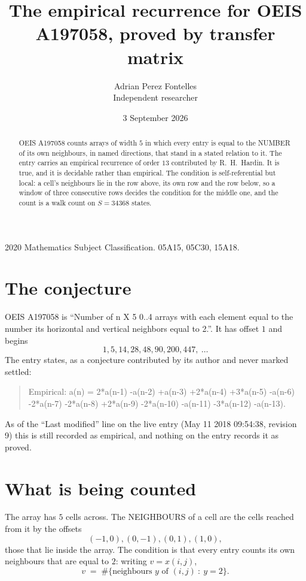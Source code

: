\documentclass[11pt,a4paper]{article}
\title{The empirical recurrence for OEIS A197058, proved by transfer matrix}
\author{Adrian Perez Fontelles\\ \small Independent researcher}
\date{3 September 2026}
\theoremstyle{plain}
\theoremstyle{definition}
\begin{document}
\maketitle

\begin{abstract}
OEIS A197058 counts arrays of width $5$ in which every entry is equal to the NUMBER of its own
neighbours, in named directions, that stand in a stated relation to it. The entry carries an
empirical recurrence of order $13$ contributed by R.~H.~Hardin. It is true, and it is
decidable rather than empirical. The condition is self-referential but local: a cell's
neighbours lie in the row above, its own row and the row below, so a window of three
consecutive rows decides the condition for the middle one, and the count is a walk count on
$S=34368$ states.
\end{abstract}

\noindent\small 2020 Mathematics Subject Classification. 05A15, 05C30, 15A18.\normalsize

\section{The conjecture}

OEIS A197058 is ``Number of n X 5 0..4 arrays with each element equal to the number its horizontal and vertical neighbors equal to 2.''. It has offset $1$ and begins
\[
1, 5, 14, 28, 48, 90, 200, 447,\ \dots
\]
The entry states, as a conjecture contributed by its author and never marked settled:
\begin{quote}
Empirical: a(n) = 2*a(n-1) -a(n-2) +a(n-3) +2*a(n-4) +3*a(n-5) -a(n-6) -2*a(n-7) -2*a(n-8) +2*a(n-9) -2*a(n-10) -a(n-11) -3*a(n-12) -a(n-13).
\end{quote}
As of the ``Last modified'' line on the live entry (May 11 2018 09:54:38, revision 9) this is still
recorded as empirical, and nothing on the entry records it as proved.

\section{What is being counted}

The array has $5$ cells across. The NEIGHBOURS of a cell are the cells reached from it by the
offsets
\[
(-1,0), (0,-1), (0,1), (1,0),
\]
those that lie inside the array. The condition is that every entry counts its own neighbours
that are equal to $2$: writing $v=x(i,j)$,
\[
v\;=\;\#\{\text{neighbours } y \text{ of } (i,j)\ :\ y=2\} .
\]
\end{document}
